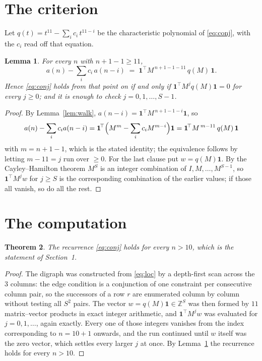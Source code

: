 \documentclass[11pt,a4paper]{article}
\theoremstyle{plain}
\newtheorem{theorem}{Theorem}
\newtheorem{lemma}[theorem]{Lemma}
\theoremstyle{definition}
\begin{document}
\section{The criterion}

Let $q(t)=t^{11}-\sum_i c_i\,t^{11-i}$ be the characteristic polynomial of
\eqref{eq:conj}, with the $c_i$ read off that equation.

\begin{lemma}\label{lem:crit}
For every $n$ with $n+1-1\ge11$,
\[
a(n)-\sum_i c_i\,a(n-i)\;=\;\mathbf{1}^{\!\top}M^{\,n+1-1-11}\,q(M)\,\mathbf{1} .
\]
Hence \eqref{eq:conj} holds from that point on if and only if
$\mathbf{1}^{\!\top}M^{j}q(M)\mathbf{1}=0$ for every $j\ge0$; and it is enough to check
$j=0,1,\dots,S-1$.
\end{lemma}

\begin{proof}
By Lemma~\ref{lem:walk}, $a(n-i)=\mathbf{1}^{\!\top}M^{\,n+1-1-i}\mathbf{1}$, so
\[
a(n)-\sum_i c_i a(n-i)
=\mathbf{1}^{\!\top}\Bigl(M^{m}-\sum_i c_i M^{m-i}\Bigr)\mathbf{1}
=\mathbf{1}^{\!\top}M^{\,m-11}\,q(M)\,\mathbf{1}
\]
with $m=n+1-1$, which is the stated identity; the equivalence follows by letting
$m-11=j$ run over $\ge0$. For the last clause put $w=q(M)\mathbf{1}$. By the
Cayley--Hamilton theorem $M^{S}$ is an integer combination of $I,M,\dots,M^{S-1}$, so
$\mathbf{1}^{\!\top}M^{j}w$ for $j\ge S$ is the corresponding combination of the earlier
values; if those all vanish, so do all the rest.
\end{proof}

\section{The computation}

\begin{theorem}
The recurrence \eqref{eq:conj} holds for every $n>10$, which is the statement of
Section~1.
\end{theorem}

\begin{proof}
The digraph was constructed from \eqref{eq:loc} by a depth-first scan across the $3$
columns: the edge condition is a conjunction of one constraint per consecutive column
pair, so the successors of a row $r$ are enumerated column by column without testing all
$S^2$ pairs. The vector $w=q(M)\mathbf{1}\in\mathbb{Z}^{S}$ was then formed by $11$
matrix--vector products in exact integer arithmetic, and $\mathbf{1}^{\!\top}M^{j}w$ was
evaluated for $j=0,1,\dots$, again exactly. Every one of those integers vanishes from the
index corresponding to $n=10+1$ onwards, and the run continued until $w$ itself was the
zero vector, which settles every larger $j$ at once. By Lemma~\ref{lem:crit} the recurrence
holds for every $n>10$.
\end{proof}
\end{document}
